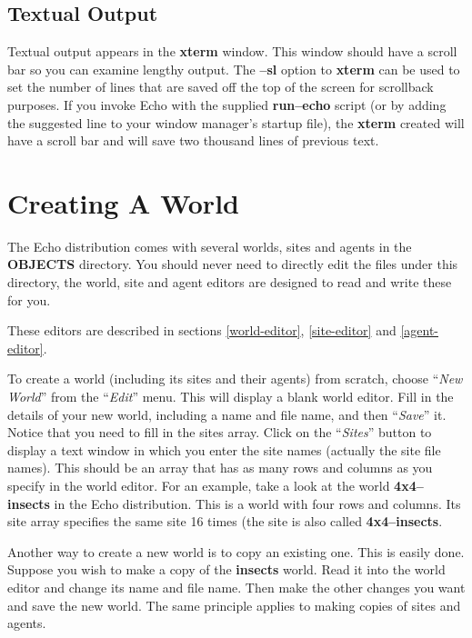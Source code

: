 \subsection{Textual Output}

Textual output appears in the {\bf xterm} window. This window should have a
scroll bar so you can examine lengthy output. The {\bf --sl} option to
{\bf xterm} can be used to set the number of lines that are saved off
the top of the screen for scrollback purposes. If you invoke Echo with
the supplied {\bf run--echo} script (or by adding the suggested line
to your window manager's startup file), the {\bf xterm} created will
have a scroll bar and will save two thousand lines of previous text.

\section{Creating A World}

The Echo distribution comes with several worlds, sites and agents in
the {\bf OBJECTS} directory. You should never need to directly edit
the files under this directory, the world, site and agent editors are
designed to read and write these for you.

These editors are described in sections \ref{world-editor},
\ref{site-editor} and \ref{agent-editor}.

To create a world (including its sites and their agents) from scratch,
choose ``{\sl New World}'' from the ``{\sl Edit}'' menu. This will
display a blank world editor. Fill in the details of your new world,
including a name and file name, and then ``{\sl Save}'' it. Notice
that you need to fill in the sites array. Click on the
``{\sl Sites}'' button to display a text window in which you enter
the site names (actually the site file names). This should be an array
that has as many rows and columns as you specify in the world editor.
For an example, take a look at the world {\bf 4x4--insects} in the
Echo distribution. This is a world with four rows and columns. Its
site array specifies the same site 16 times (the site is also called
{\bf 4x4--insects}.

Another way to create a new world is to copy an existing
one.  This is easily done. Suppose you wish to
make a copy of the {\bf insects} world. Read it into the world editor
and change its name and file name. Then make the other changes you
want and save the new world. The same principle applies to making
copies of sites and agents.  

